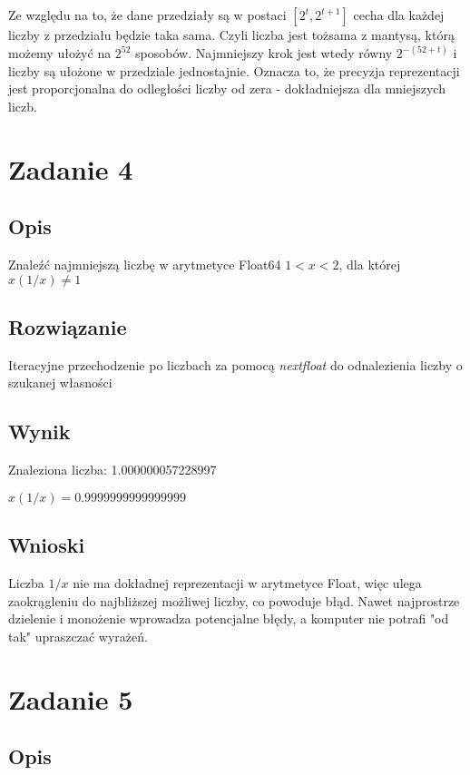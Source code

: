 \documentclass[12pt, letterpaper]{article}
\begin{document}
Ze względu na to, że dane przedziały są w postaci $[2^{t}, 2^{t + 1}]$ cecha
dla każdej liczby z przedziału
będzie taka sama. Czyli liczba jest tożsama z mantysą, którą możemy ułożyć na
$2^{52}$ sposobów.
Najmniejszy krok jest wtedy równy $2^{-(52 + t)}$ i liczby są ułożone w
przedziale jednostajnie. Oznacza to, że precyzja reprezentacji jest
proporcjonalna do odległości liczby od zera - dokładniejsza dla mniejszych liczb.

\section{Zadanie 4}

\subsection{Opis}

Znaleźć najmniejszą liczbę w arytmetyce Float64 $ 1 < x < 2$, dla której
$x(1/x) \neq 1$

\subsection{Rozwiązanie}

Iteracyjne przechodzenie po liczbach za pomocą \textit{nextfloat} do
odnalezienia liczby o szukanej własności

\subsection{Wynik}

Znaleziona liczba: 1.000000057228997

$x(1/x) = 0.9999999999999999$

\subsection{Wnioski}

Liczba $1/x$ nie ma dokładnej reprezentacji
w arytmetyce Float, więc ulega zaokrągleniu do najbliższej możliwej liczby, co
powoduje błąd. Nawet najprostrze dzielenie i monożenie wprowadza potencjalne
błędy, a komputer nie potrafi "od tak" upraszczać wyrażeń.

\section{Zadanie 5}

\subsection{Opis}
\end{document}
